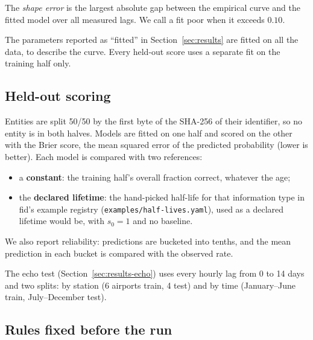 The \emph{shape error} is the largest absolute gap between the empirical
curve and the fitted model over all measured lags. We call a fit poor when
it exceeds $0.10$.

The parameters reported as ``fitted'' in Section~\ref{sec:results} are fitted on all
the data, to describe the curve. Every held-out score uses a separate fit on
the training half only.

\subsection{Held-out scoring}

Entities are split 50/50 by the first byte of the SHA-256 of their
identifier, so no entity is in both halves. Models are fitted on one half
and scored on the other with the Brier score, the mean squared error of
the predicted probability (lower is better). Each model is compared with
two references:
\begin{itemize}
  \item a \textbf{constant}: the training half's overall fraction correct,
    whatever the age;
  \item the \textbf{declared lifetime}: the hand-picked half-life for that
    information type in fid's example registry
    (\texttt{examples/half-lives.yaml}), used as a declared lifetime would be,
    with $s_0 = 1$ and no baseline.
\end{itemize}
We also report reliability: predictions are bucketed into tenths, and the
mean prediction in each bucket is compared with the observed rate.

The echo test (Section~\ref{sec:results-echo}) uses every hourly lag from
0 to 14 days and two splits: by station (6 airports train, 4 test) and by
time (January--June train, July--December test).

\subsection{Rules fixed before the run}


